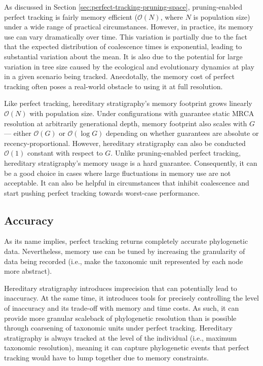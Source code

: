 As discussed in Section \ref{sec:perfect-tracking-pruning-space}, pruning-enabled perfect tracking is fairly memory efficient ($\mathcal{O}(N)$, where $N$ is population size) under a wide range of practical circumstances.
However, in practice, its memory use can vary dramatically over time.
This variation is partially due to the fact that the expected distribution of coalescence times is exponential, leading to substantial variation about the mean.
It is also due to the potential for large variation in tree size caused by the ecological and evolutionary dynamics at play in a given scenario being tracked.
Anecdotally, the memory cost of perfect tracking often poses a real-world obstacle to using it at full resolution.

Like perfect tracking, hereditary stratigraphy's memory footprint grows linearly $\mathcal{O}(N)$ with population size.
Under configurations with guarantee static MRCA resolution at arbitrarily generational depth, memory footprint also scales with $G$ --- either $\mathcal{O}(G)$ or $\mathcal{O}(\log G)$ depending on whether guarantees are absolute or recency-proportional.  %
However, hereditary stratigraphy can also be conducted $\mathcal{O}(1)$ constant with respect to $G$.
Unlike pruning-enabled perfect tracking, hereditary stratigraphy's memory usage is a hard guarantee.
Consequently, it can be a good choice in cases where large fluctuations in memory use are not acceptable.
It can also be helpful in circumstances that inhibit coalescence and start pushing perfect tracking towards worst-case performance.

\subsection{Accuracy}

As its name implies, perfect tracking returns completely accurate phylogenetic data.
Nevertheless, memory use can be tuned by increasing the granularity of data being recorded (i.e., make the taxonomic unit represented by each node more abstract).

Hereditary stratigraphy introduces imprecision that can potentially lead to inaccuracy.
At the same time, it introduces tools for precisely controlling the level of inaccuracy and its trade-off with memory and time costs.
As such, it can provide more granular scaleback of phylogenetic resolution than is possible through coarsening of taxonomic units under perfect tracking.
Hereditary stratigraphy is always tracked at the level of the individual (i.e., maximum taxonomic resolution), meaning it can capture phylogenetic events that perfect tracking would have to lump together due to memory constraints.

